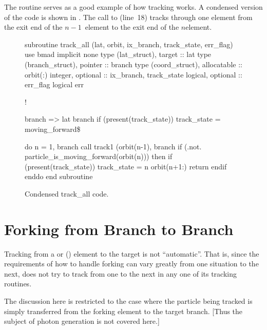 {{{{{{{{The  routine serves as a good example of how tracking
works. A condensed version of the code is shown in
. The call to  (line~18) tracks
through one element from the exit end of the $n-1$\St\ element to the
exit end of the $n$\Th element.

\begin{figure}[h!]
\begin{centering}
\small
\begin{listing}{1}
  subroutine track_all (lat, orbit, ix_branch, track_state, err_flag)
    use bmad
    implicit none
    type (lat_struct), target :: lat
    type (branch_struct), pointer :: branch
    type (coord_struct), allocatable :: orbit(:)
    integer, optional :: ix_branch, track_state
    logical, optional :: err_flag
    logical err

    ! 

    branch => lat%
    branch%
    if (present(track_state)) track_state = moving_forward\$

    do n = 1, branch%
      call track1 (orbit(n-1), branch%
      if (.not. particle_is_moving_forward(orbit(n))) then
        if (present(track_state)) track_state = n
        orbit(n+1:)%
        return
      endif
    enddo
  end subroutine
\end{listing}
\caption{Condensed track_all code.}
\label{f:track.all}
\end{centering}
\end{figure}

\section{Forking from Branch to Branch}

Tracking from a  or  () element
to the target  is not ``automatic''. That is, since the
requirements of how to handle forking can vary greatly from one
situation to the next, \bmad does not try to track from one 
to the next in any one of its tracking routines. 

The discussion here is restricted to the case where the particle being
tracked is simply transferred from the forking element to the target
branch. [Thus the subject of photon generation is not covered here.]

}}}}}}}}
